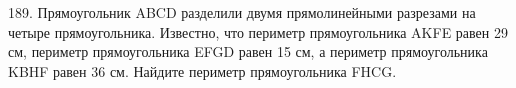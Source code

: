 189. Прямоугольник ABCD разделили двумя прямолинейными разрезами на четыре прямоугольника. Известно, что периметр прямоугольника AKFE равен 29 см, периметр прямоугольника EFGD равен 15 см,  а периметр прямоугольника KBHF равен 36 см. Найдите периметр прямоугольника FHCG.\\
